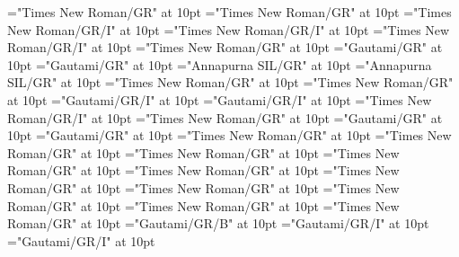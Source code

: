 \documentclass[a4paper]{article}
\begin{document}
\font\spanenLexSensepublishStemGlossPubLdtesensesensesentryletData="Times New Roman/GR" at 10pt
\font\spanensensesentryletData="Times New Roman/GR" at 10pt
\font\grammaticalinfoentryletData="Times New Roman/GR/I" at 10pt
\font\partofspeechengrammaticalinfoentryletData="Times New Roman/GR/I" at 10pt
\font\spanenpartofspeechengrammaticalinfoentryletData="Times New Roman/GR/I" at 10pt
\font\xsensenumbersensesensesentryletData="Times New Roman/GR" at 10pt
\font\xitemteLexSensepublishStemGlossPubLdtesensesensesentryletData="Gautami/GR" at 10pt
\font\spantexitemteLexSensepublishStemGlossPubLdtesensesensesentryletData="Gautami/GR" at 10pt
\font\xitemhiLexSensepublishStemGlossPubLdtesensesensesentryletData="Annapurna SIL/GR" at 10pt
\font\spanhixitemhiLexSensepublishStemGlossPubLdtesensesensesentryletData="Annapurna SIL/GR" at 10pt
\font\examplessensesensesentryletData="Times New Roman/GR" at 10pt
\font\xitemexamplessensesensesentryletData="Times New Roman/GR" at 10pt
\font\exampleggoTeluINxitemexamplessensesensesentryletData="Gautami/GR/I" at 10pt
\font\spanggoTeluINexampleggoTeluINxitemexamplessensesensesentryletData="Gautami/GR/I" at 10pt
\font\spanenexampleggoTeluINxitemexamplessensesensesentryletData="Times New Roman/GR/I" at 10pt
\font\translationsxitemexamplessensesensesentryletData="Times New Roman/GR" at 10pt
\font\translationLdtetranslationsxitemexamplessensesensesentryletData="Gautami/GR" at 10pt
\font\spantetranslationLdtetranslationsxitemexamplessensesensesentryletData="Gautami/GR" at 10pt
\font\spanentranslationLdtetranslationsxitemexamplessensesensesentryletData="Times New Roman/GR" at 10pt
\font\spanenexamplessensesensesentryletData="Times New Roman/GR" at 10pt
\font\primaryrefsentryletData="Times New Roman/GR" at 10pt
\font\spanenprimaryrefsentryletData="Times New Roman/GR" at 10pt
\font\entryreftypeprimaryrefsentryletData="Times New Roman/GR" at 10pt
\font\LexEntryTypepublishStemEntryTypeAbbreviationPubenentryreftypeprimaryrefsentryletData="Times New Roman/GR" at 10pt
\font\spanenLexEntryTypepublishStemEntryTypeAbbreviationPubenentryreftypeprimaryrefsentryletData="Times New Roman/GR" at 10pt
\font\spanenentryreftypeprimaryrefsentryletData="Times New Roman/GR" at 10pt
\font\entryrefcomponentprimaryrefsentryletData="Times New Roman/GR" at 10pt
\font\aentryrefcomponentprimaryrefsentryletData="Times New Roman/GR" at 10pt
\font\LexEntrypublishStemComponentTargetHeadWordRefggoTeluINaentryrefcomponentprimaryrefsentryletData="Gautami/GR/B" at 10pt
\font\exampleggoTeluINexamplessensesensesentryletData="Gautami/GR/I" at 10pt
\font\spanggoTeluINexampleggoTeluINexamplessensesensesentryletData="Gautami/GR/I" at 10pt
\end{document}
